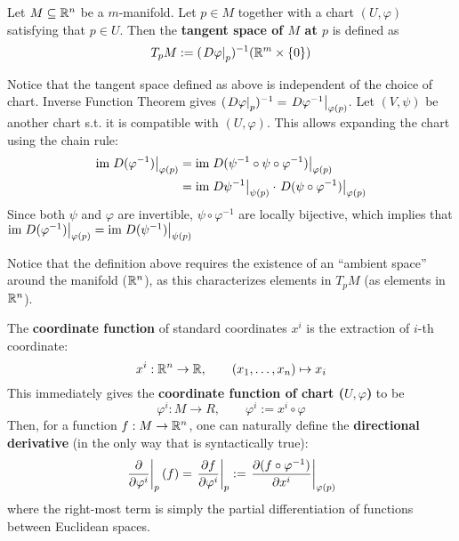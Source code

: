 \documentclass{article}
\begin{document}
\begin{definition}\label{def: tangent space in R^n}
    Let $M \subseteq \mathbb{R}^n$ be a $m$-manifold. Let $p \in M$ together with a chart $(U, \varphi)$ satisfying that $p \in U$. Then the \textbf{tangent space of $M$ at $p$} is defined as
    \[
        T_pM := (\left.D\varphi\right|_{p})^{-1}(\mathbb{R}^m \times \{0\})
    \]
\end{definition}

\begin{remark}
    Notice that the tangent space defined as above is independent of the choice of chart. Inverse Function Theorem gives $(\left.D\varphi\right|_{p})^{-1} = \left.D\varphi^{-1}\right|_{\varphi(p)}$. Let $(V, \psi)$ be another chart s.t. it is compatible with $(U, \varphi)$. This allows expanding the chart using the chain rule:
    \begin{align*}
        \mathrm{im} \left.D(\varphi^{-1})\right|_{\varphi(p)}
        & = \mathrm{im} \left.D(\psi^{-1} \circ \psi \circ \varphi^{-1})\right|_{\varphi(p)} \\
        & = \mathrm{im} \left.D\psi^{-1}\right|_{\psi(p)} \cdot \left.D(\psi \circ \varphi^{-1})\right|_{\varphi(p)}
    \end{align*}
    Since both $\psi$ and $\varphi$ are invertible, $\psi \circ \varphi^{-1}$ are locally bijective, which implies that $\mathrm{im} \left.D(\varphi^{-1})\right|_{\varphi(p)} = \mathrm{im} \left.D(\psi^{-1})\right|_{\psi(p)}$
\end{remark}

\begin{remark}
    Notice that the definition above requires the existence of an ``ambient space'' around the manifold ($\mathbb{R}^n$), as this characterizes elements in $T_pM$ (as elements in $\mathbb{R}^n$).
\end{remark}

\begin{definition}
    The \textbf{coordinate function} of standard coordinates $x^i$ is the extraction of $i$-th coordinate:
    \[
        x^i : \mathbb{R}^n \to \mathbb{R}, \qquad (x_1, \dots, x_n) \mapsto x_i
    \]
    This immediately gives the \textbf{coordinate function of chart ($U, \varphi$)} to be
    \[
        \varphi^i: M \to R, \qquad \varphi^i := x^i \circ \varphi
    \]
    Then, for a function $f: M \to \mathbb{R}^n$, one can naturally define the \textbf{directional derivative} (in the only way that is syntactically true):
    \[
        \left.\frac{\partial }{\partial \varphi^i}\right|_{p} (f) = \left.\frac{\partial f}{\partial \varphi^i}\right|_{p} := \left.\frac{\partial (f \circ \varphi^{-1})}{\partial x^i}\right|_{\varphi(p)}
    \]
    where the right-most term is simply the partial differentiation of functions between Euclidean spaces.
\end{definition}
\end{document}
